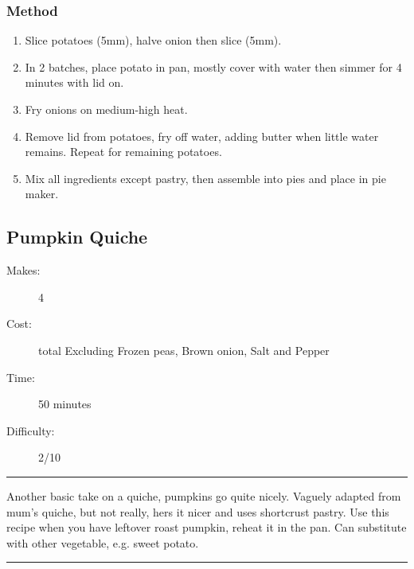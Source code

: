 \documentclass[]{article}
\begin{document}
\subsubsection*{\Large Method}
\begin{enumerate}[font=\huge\color{accent}]
	\item Slice potatoes (5mm), halve onion then slice (5mm).
	\item In 2 batches, place potato in pan, mostly cover with water then simmer for 4 minutes with lid on.
	\item Fry onions on medium-high heat.
	\item Remove lid from potatoes, fry off water, adding butter when little water remains. Repeat for remaining potatoes.
	\item Mix all ingredients except pastry, then assemble into pies and place in pie maker.
\end{enumerate}
\newpage
{}\label{rec:Pumpkin Quiche}
\subsection*{\center\huge Pumpkin Quiche}
\begin{description}
\item[Makes:] 4 
\item[Cost:]  total Excluding Frozen peas, Brown onion, Salt and Pepper
\item[Time:] 50 minutes
\item[Difficulty:] 2/10
\end{description}
\vspace{0.2cm}\hrule\vspace{0.5cm}
\begin{adjustwidth}{0.5 cm}{0.5 cm}

Another basic take on a quiche, pumpkins go quite nicely. Vaguely adapted from mum's quiche, but not really, hers it nicer and uses shortcrust pastry. Use this recipe when you have leftover roast pumpkin, reheat it in the pan. Can substitute with other vegetable, e.g. sweet potato. \hfill{}\color{black}

\end{adjustwidth}
\vspace{0.5cm}\hrule
\end{document}

